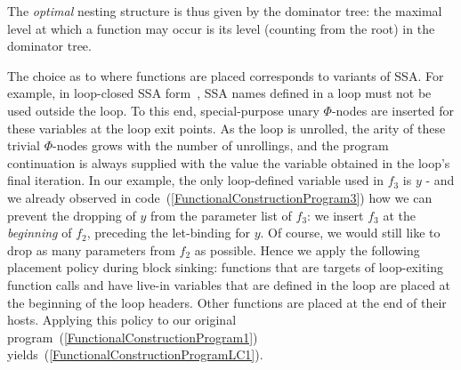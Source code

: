 The \emph{optimal} nesting structure is thus given by the dominator
tree: the maximal level at which a function may occur is its level
(counting from the root) in the dominator tree.

The choice as to where functions are placed corresponds to variants of
SSA. For example, in loop-closed SSA
form~\cite{Chapter14GraphsAndGating,Chapter19LoopTree}, SSA names
defined in a loop must not be used outside the loop. To this end,
special-purpose unary $\Phi$-nodes are inserted for these variables at
the loop exit points. As the loop is unrolled, the arity of these
trivial $\Phi$-nodes grows with the number of unrollings, and the
program continuation is always supplied with the value the variable
obtained in the loop's final iteration.  In our example, the only
loop-defined variable used in $f_3$ is $y$ - and we already observed
in code~(\ref{FunctionalConstructionProgram3}) how we can prevent the
dropping of $y$ from the parameter list of $f_3$: we insert $f_3$ at
the \emph{beginning} of $f_2$, preceding the let-binding for $y$. Of
course, we would still like to drop as many parameters from $f_2$ as
possible. Hence we apply the following placement policy during block
sinking: functions that are targets of loop-exiting function calls and
have live-in variables that are defined in the loop are placed at the
beginning of the loop headers.  Other functions are placed at the end
of their hosts. Applying this policy to our original
program~(\ref{FunctionalConstructionProgram1})
yields~(\ref{FunctionalConstructionProgramLC1}).
